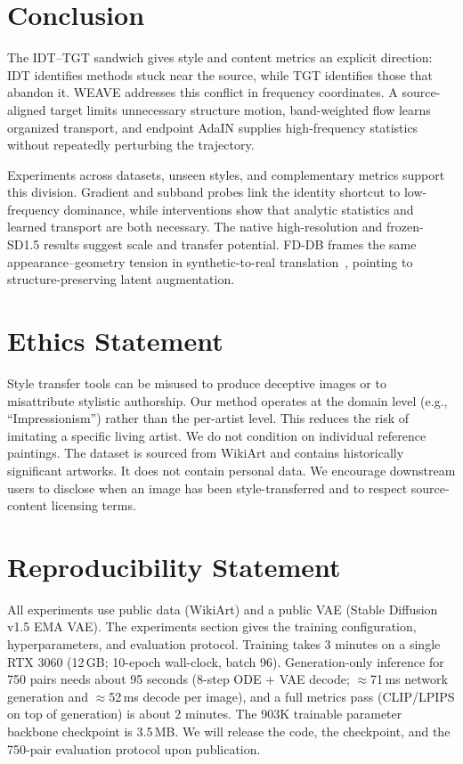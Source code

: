 \documentclass[letterpaper]{article}
\begin{document}
\section{Conclusion}

The IDT--TGT sandwich gives style and content metrics an explicit direction: IDT identifies
methods stuck near the source, while TGT identifies those that abandon it. WEAVE addresses
this conflict in frequency coordinates. A source-aligned target limits unnecessary structure
motion, band-weighted flow learns organized transport, and endpoint AdaIN supplies
high-frequency statistics without repeatedly perturbing the trajectory.

Experiments across datasets, unseen styles, and complementary metrics support this division.
Gradient and subband probes link the identity shortcut to low-frequency dominance, while
interventions show that analytic statistics and learned transport are both necessary. The
native high-resolution and frozen-SD1.5 results suggest scale and transfer potential.
FD-DB frames the same appearance--geometry tension in synthetic-to-real
translation~\cite{zang2026fddb}, pointing to structure-preserving latent augmentation.

\section*{Ethics Statement}
Style transfer tools can be misused to produce deceptive images or to misattribute stylistic authorship.
Our method operates at the domain level (e.g., ``Impressionism'') rather than the per-artist level.
This reduces the risk of imitating a specific living artist.
We do not condition on individual reference paintings.
The dataset is sourced from WikiArt and contains historically significant artworks.
It does not contain personal data.
We encourage downstream users to disclose when an image has been style-transferred and to respect source-content licensing terms.

\section*{Reproducibility Statement}
All experiments use public data (WikiArt) and a public VAE (Stable Diffusion v1.5 EMA VAE).
The experiments section gives the training configuration, hyperparameters, and evaluation protocol.
Training takes 3 minutes on a single RTX 3060 (12\,GB; 10-epoch wall-clock, batch 96).
Generation-only inference for 750 pairs needs about 95 seconds (8-step ODE + VAE decode; $\approx$71\,ms network generation and $\approx$52\,ms decode per image), and a full metrics pass (CLIP/LPIPS on top of generation) is about 2 minutes.
The 903K trainable parameter backbone checkpoint is 3.5\,MB.
We will release the code, the checkpoint, and the 750-pair evaluation protocol upon publication.


\end{document}

